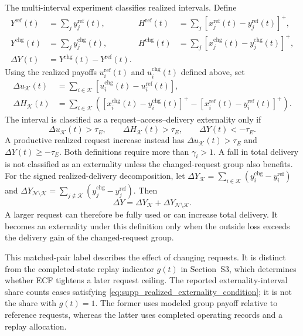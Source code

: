 \documentclass[11pt]{article}
\begin{document}
The multi-interval experiment classifies realized intervals. Define
\begin{align}
Y^{\mathrm{ref}}(t)&=\sum_j y_j^{\mathrm{ref}}(t),&
H^{\mathrm{ref}}(t)&=\sum_j[x_j^{\mathrm{ref}}(t)-y_j^{\mathrm{ref}}(t)]^+,\nonumber\\
Y^{\mathrm{chg}}(t)&=\sum_j y_j^{\mathrm{chg}}(t),&
H^{\mathrm{chg}}(t)&=\sum_j[x_j^{\mathrm{chg}}(t)-y_j^{\mathrm{chg}}(t)]^+,\nonumber\\
\Delta Y(t)&=Y^{\mathrm{chg}}(t)-Y^{\mathrm{ref}}(t).
\label{eq:supp_realized_delivery_idle_totals}
\end{align}
Using the realized payoffs $u_i^{\mathrm{ref}}(t)$ and
$u_i^{\mathrm{chg}}(t)$ defined above, set
\begin{align}
\Delta u_{\mathcal K}(t)
&=\sum_{i\in\mathcal K}
[u_i^{\mathrm{chg}}(t)-u_i^{\mathrm{ref}}(t)],\nonumber\\
\Delta H_{\mathcal K}(t)
&=\sum_{i\in\mathcal K}\left(
[x_i^{\mathrm{chg}}(t)-y_i^{\mathrm{chg}}(t)]^+
-[x_i^{\mathrm{ref}}(t)-y_i^{\mathrm{ref}}(t)]^+\right).
\label{eq:supp_realized_group_classification_changes}
\end{align}
The interval is classified as a request--access--delivery externality only if
\begin{equation}
\Delta u_{\mathcal K}(t)>\tau_E,
\qquad
\Delta H_{\mathcal K}(t)>\tau_E,
\qquad
\Delta Y(t)<-\tau_E.
\label{eq:supp_realized_externality_condition}
\end{equation}
A productive realized request increase instead has
$\Delta u_{\mathcal K}(t)>\tau_E$ and $\Delta Y(t)\ge-\tau_E$.
Both definitions require more than $\gamma_i>1$. A fall in total delivery is not
classified as an externality unless the changed-request group also benefits.
For the signed realized-delivery decomposition, let
$\Delta Y_{\mathcal K}=\sum_{i\in\mathcal K}
(y_i^{\mathrm{chg}}-y_i^{\mathrm{ref}})$ and
$\Delta Y_{\mathcal N\setminus\mathcal K}=\sum_{j\notin\mathcal K}
(y_j^{\mathrm{chg}}-y_j^{\mathrm{ref}})$. Then
\begin{equation}
\Delta Y=\Delta Y_{\mathcal K}+
\Delta Y_{\mathcal N\setminus\mathcal K}.
\label{eq:supp_delivery_externality_identity}
\end{equation}
A larger request can therefore be fully used or can increase total delivery.
It becomes an externality under this definition only when the outside loss
exceeds the delivery gain of the changed-request group.

This matched-pair label describes the effect of changing requests. It is
distinct from the completed-state replay indicator $g(t)$ in Section~S3, which
determines whether ECF tightens a later request ceiling. The reported
externality-interval share counts cases satisfying
\eqref{eq:supp_realized_externality_condition}; it is not the share with
$g(t)=1$. The former uses modeled group payoff relative to reference requests,
whereas the latter uses completed operating records and a replay allocation.
\end{document}

